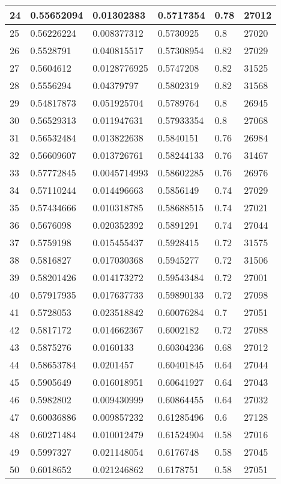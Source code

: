 \begin{longtable}{|l|l|l|l|l|l|}
24 & 0.55652094 & 0.01302383 & 0.5717354 & 0.78 & 27012 \\ \hline 
25 & 0.56226224 & 0.008377312 & 0.5730925 & 0.8 & 27020 \\ \hline 
26 & 0.5528791 & 0.040815517 & 0.57308954 & 0.82 & 27029 \\ \hline 
27 & 0.5604612 & 0.0128776925 & 0.5747208 & 0.82 & 31525 \\ \hline 
28 & 0.5556294 & 0.04379797 & 0.5802319 & 0.82 & 31568 \\ \hline 
29 & 0.54817873 & 0.051925704 & 0.5789764 & 0.8 & 26945 \\ \hline 
30 & 0.56529313 & 0.011947631 & 0.57933354 & 0.8 & 27068 \\ \hline 
31 & 0.56532484 & 0.013822638 & 0.5840151 & 0.76 & 26984 \\ \hline 
32 & 0.56609607 & 0.013726761 & 0.58244133 & 0.76 & 31467 \\ \hline 
33 & 0.57772845 & 0.0045714993 & 0.58602285 & 0.76 & 26976 \\ \hline 
34 & 0.57110244 & 0.014496663 & 0.5856149 & 0.74 & 27029 \\ \hline 
35 & 0.57434666 & 0.010318785 & 0.58688515 & 0.74 & 27021 \\ \hline 
36 & 0.5676098 & 0.020352392 & 0.5891291 & 0.74 & 27044 \\ \hline 
37 & 0.5759198 & 0.015455437 & 0.5928415 & 0.72 & 31575 \\ \hline 
38 & 0.5816827 & 0.017030368 & 0.5945277 & 0.72 & 31506 \\ \hline 
39 & 0.58201426 & 0.014173272 & 0.59543484 & 0.72 & 27001 \\ \hline 
40 & 0.57917935 & 0.017637733 & 0.59890133 & 0.72 & 27098 \\ \hline 
41 & 0.5728053 & 0.023518842 & 0.60076284 & 0.7 & 27051 \\ \hline 
42 & 0.5817172 & 0.014662367 & 0.6002182 & 0.72 & 27088 \\ \hline 
43 & 0.5875276 & 0.0160133 & 0.60304236 & 0.68 & 27012 \\ \hline 
44 & 0.58653784 & 0.0201457 & 0.60401845 & 0.64 & 27044 \\ \hline 
45 & 0.5905649 & 0.016018951 & 0.60641927 & 0.64 & 27043 \\ \hline 
46 & 0.5982802 & 0.009430999 & 0.60864455 & 0.64 & 27032 \\ \hline 
47 & 0.60036886 & 0.009857232 & 0.61285496 & 0.6 & 27128 \\ \hline 
48 & 0.60271484 & 0.010012479 & 0.61524904 & 0.58 & 27016 \\ \hline 
49 & 0.5997327 & 0.021148054 & 0.6176748 & 0.58 & 27045 \\ \hline 
50 & 0.6018652 & 0.021246862 & 0.6178751 & 0.58 & 27051 \\ \hline 
\end{longtable}